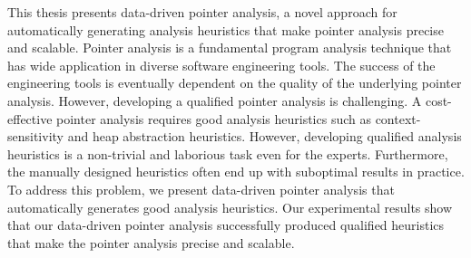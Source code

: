 This thesis presents data-driven pointer analysis, a novel approach for automatically generating analysis heuristics that make pointer analysis precise and scalable. 
Pointer analysis is a fundamental program analysis technique that has wide application in diverse software engineering tools. The success of the engineering tools is eventually dependent on the quality of the underlying pointer analysis.
However, developing a qualified pointer analysis is challenging.
A cost-effective pointer analysis requires good analysis heuristics such as context-sensitivity and heap abstraction heuristics.
However, developing qualified analysis heuristics is a non-trivial and laborious task even for the experts. Furthermore, the manually designed heuristics often end up with suboptimal results in practice.
To address this problem, we present data-driven pointer analysis that automatically generates good analysis heuristics.
Our experimental results show that our data-driven pointer analysis successfully produced qualified heuristics that make the pointer analysis precise and scalable.









